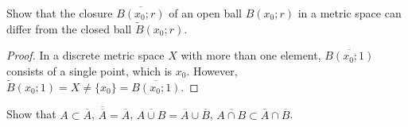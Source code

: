 \begin{exercise}\label{chapter1:section3:exercise8}
    Show that the closure $\overline{B(x_{0}; r)}$ of an open ball $B(x_{0}; r)$ in a metric space can differ from the closed ball $\widetilde{B}(x_{0}; r)$.
\end{exercise}

\begin{proof}
    In a discrete metric space $X$ with more than one element, $\overline{B(x_{0}; 1)}$ consists of a single point, which is $x_{0}$. However, $\widetilde{B}(x_{0}; 1) = X \ne \{ x_{0} \} = \overline{B(x_{0}; 1)}$.
\end{proof}

\begin{exercise}\label{chapter1:section3:exercise9}
    Show that $A\subset \overline{A}$, $\overline{\overline{A}} = \overline{A}$, $\overline{A\cup B} = \overline{A}\cup\overline{B}$, $\overline{A\cap B} \subset \overline{A}\cap\overline{B}$.
\end{exercise}

